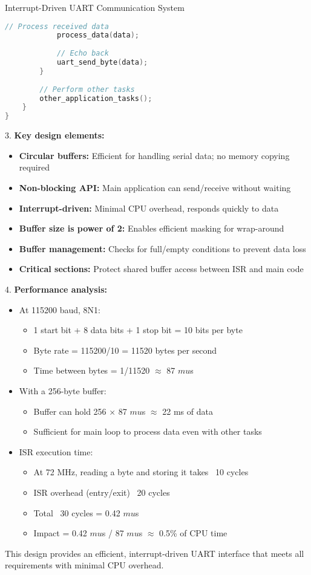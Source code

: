\begin{example2}{Interrupt-Driven UART Communication System}
\begin{lstlisting}[language=C, style=basesmol]
            // Process received data
            process_data(data);
            
            // Echo back
            uart_send_byte(data);
        }
        
        // Perform other tasks
        other_application_tasks();
    }
}
\end{lstlisting}

3. \textbf{Key design elements:}
   \begin{itemize}
     \item \textbf{Circular buffers:} Efficient for handling serial data; no memory copying required
     \item \textbf{Non-blocking API:} Main application can send/receive without waiting
     \item \textbf{Interrupt-driven:} Minimal CPU overhead, responds quickly to data
     \item \textbf{Buffer size is power of 2:} Enables efficient masking for wrap-around
     \item \textbf{Buffer management:} Checks for full/empty conditions to prevent data loss
     \item \textbf{Critical sections:} Protect shared buffer access between ISR and main code
   \end{itemize}

4. \textbf{Performance analysis:}
   \begin{itemize}
     \item At 115200 baud, 8N1:
     \begin{itemize}
       \item 1 start bit + 8 data bits + 1 stop bit = 10 bits per byte
       \item Byte rate = 115200/10 = 11520 bytes per second
       \item Time between bytes = 1/11520 $\approx$ 87 $mu$s
     \end{itemize}
     \item With a 256-byte buffer:
     \begin{itemize}
       \item Buffer can hold 256 × 87 $mu$s $\approx$ 22 ms of data
       \item Sufficient for main loop to process data even with other tasks
     \end{itemize}
     \item ISR execution time:
     \begin{itemize}
       \item At 72 MHz, reading a byte and storing it takes ~10 cycles
       \item ISR overhead (entry/exit) ~20 cycles
       \item Total ~30 cycles = 0.42 $mu$s
       \item Impact = 0.42 $mu$s / 87 $mu$s $\approx$ 0.5\% of CPU time
     \end{itemize}
   \end{itemize}

This design provides an efficient, interrupt-driven UART interface that meets all requirements with minimal CPU overhead.
\end{example2}